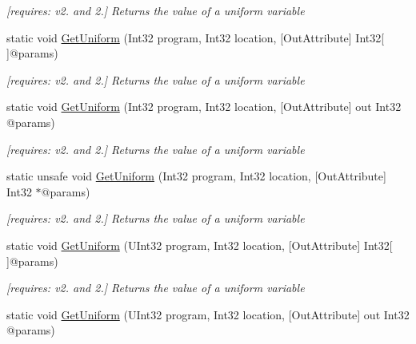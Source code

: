 \begin{DoxyCompactItemize}
\begin{DoxyCompactList}\small\item\em \mbox{[}requires\-: v2. and 2.\mbox{]} Returns the value of a uniform variable \end{DoxyCompactList}\item 
static void \hyperlink{class_open_t_k_1_1_graphics_1_1_e_s20_1_1_g_l_abc97f578c398fa35bd55481fbc5c269b}{Get\-Uniform} (Int32 program, Int32 location, \mbox{[}Out\-Attribute\mbox{]} Int32\mbox{[}$\,$\mbox{]}@params)
\begin{DoxyCompactList}\small\item\em \mbox{[}requires\-: v2. and 2.\mbox{]} Returns the value of a uniform variable \end{DoxyCompactList}\item 
static void \hyperlink{class_open_t_k_1_1_graphics_1_1_e_s20_1_1_g_l_a7748d0922a40c6c4565ee7fda3d39013}{Get\-Uniform} (Int32 program, Int32 location, \mbox{[}Out\-Attribute\mbox{]} out Int32 @params)
\begin{DoxyCompactList}\small\item\em \mbox{[}requires\-: v2. and 2.\mbox{]} Returns the value of a uniform variable \end{DoxyCompactList}\item 
static unsafe void \hyperlink{class_open_t_k_1_1_graphics_1_1_e_s20_1_1_g_l_ab1694869a76af7680608f2f42a826986}{Get\-Uniform} (Int32 program, Int32 location, \mbox{[}Out\-Attribute\mbox{]} Int32 $\ast$@params)
\begin{DoxyCompactList}\small\item\em \mbox{[}requires\-: v2. and 2.\mbox{]} Returns the value of a uniform variable \end{DoxyCompactList}\item 
static void \hyperlink{class_open_t_k_1_1_graphics_1_1_e_s20_1_1_g_l_a6fe27233006f598f1db572b85156e563}{Get\-Uniform} (U\-Int32 program, Int32 location, \mbox{[}Out\-Attribute\mbox{]} Int32\mbox{[}$\,$\mbox{]}@params)
\begin{DoxyCompactList}\small\item\em \mbox{[}requires\-: v2. and 2.\mbox{]} Returns the value of a uniform variable \end{DoxyCompactList}\item 
static void \hyperlink{class_open_t_k_1_1_graphics_1_1_e_s20_1_1_g_l_a42aa6994a4317b54a83d2a555fd4567a}{Get\-Uniform} (U\-Int32 program, Int32 location, \mbox{[}Out\-Attribute\mbox{]} out Int32 @params)

\end{DoxyCompactItemize}

